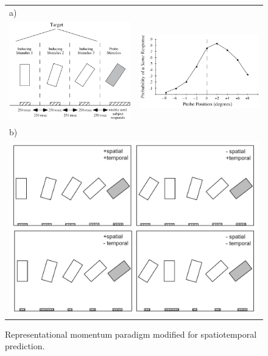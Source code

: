 \documentclass[defaultstyle,12pt]{thesis}
\begin{document}
{%
\begin{figure}[hp]
\centering
\begin{tabular}{ll}
a) \\
\includegraphics[width=80mm]{rm_a.png} &
\includegraphics[width=80mm]{rm_b.png} \\
b) \\
\multicolumn{2}{c}{\includegraphics[width=140mm]{rm_mod.pdf}} \\
\end{tabular}
\caption{Representational momentum paradigm modified for spatiotemporal prediction.}
\label{fig:exp1_task}
\end{figure}

}
\end{document}
